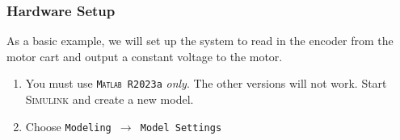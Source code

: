 \documentclass[11pt,letterpaper]{article}
\newcommand{\baro}{\pmb{\rightarrow}}
\begin{document}
\subsubsection{Hardware Setup}\label{subsubsec:hardware_setup}
As a basic example, we will set up the system to read in the encoder from the motor cart and output a constant voltage to the motor.
\begin{enumerate}
  \item You must use \texttt{\textsc{Matlab} R2023a} \textit{only}. The other versions will not work. Start \textsc{Simulink} and create a new model.
  
  
  \item Choose \texttt{Modeling $\baro$ Model Settings}
  

\end{enumerate}
\end{document}
